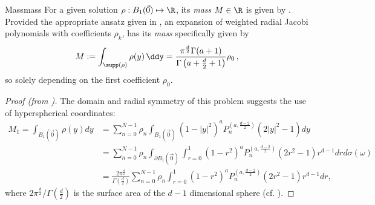 \begin{lemma}{Mass}{mass}
  For a given solution $\rho: B_1(\vec{0}) \mapsto \R$, its \textit{mass} $M \in \R$ is given by .
  Provided the appropriate ansatz given in , an expansion of weighted radial Jacobi polynomials with coefficients $\rho_k$, has its \textit{mass} specifically given by
  \begin{align*}
    M := \int_{\supp(\rho)} \rho(y) \,\ddy = \frac{\pi^{\frac{d}{2}}\Gamma (a+1)}{\Gamma \left(a+\frac{d}{2}+1\right)} \rho_0\,,
  \end{align*}
  so solely depending on the first coefficient $\rho_0$.
\end{lemma}
\begin{proof}[Proof (from \cite{2021-arbitrary-dimensions})]
  The domain and radial symmetry of this problem suggests the use of hyperspherical coordinates:
  \begin{align*}
    M_1 = \int_{B_1(\vec{0})} \rho(y) dy & = \sum_{n=0}^{N-1} \rho_{n} \int_{B_1(\vec{0})} (1-|y|^2)^a P_n^{(a,\frac{d-2}{2})}(2|y|^2-1) dy                                            \\
                                         & =\sum_{n=0}^{N-1} \rho_{n} \int_{\partial B_1(\vec{0})} \int_{r=0}^1 (1-r^2)^a P_n^{(a,\frac{d-2}{2})}(2r^2-1) r^{d-1} dr d\sigma(\omega)   \\
                                         & = \frac{2\pi^\frac{d}{2}}{\Gamma(\frac{d}{2})} \sum_{n=0}^{N-1} \rho_{n} \int_{r=0}^1 (1-r^2)^a P_n^{(a,\frac{d-2}{2})}(2r^2-1) r^{d-1} dr,
  \end{align*}
  where ${2\pi^\frac{d}{2}} / {\Gamma(\frac{d}{2})}$ is the surface area of the $d-1$ dimensional sphere (cf. ).


\end{proof}
